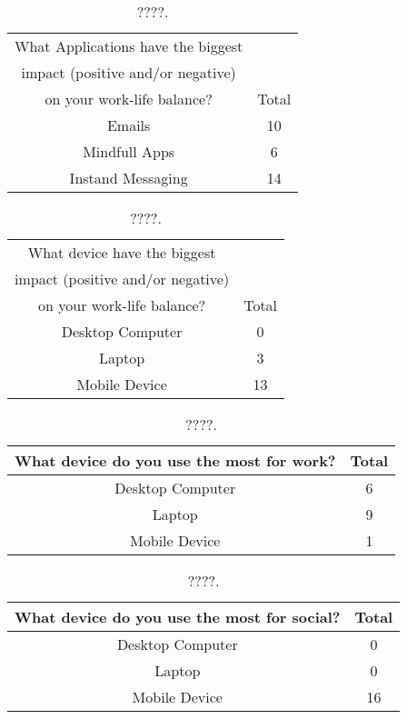 \documentclass{sigchi}
\begin{document}
\begin{table}[ht]
	\centering
	\begin{tabular}[t]{ |c| c | }
		\hline
		What Applications have the biggest & \\
		impact (positive and/or negative) & \\
		on your work-life balance?  & Total  \\ 
		\hline
		Emails & 10 \\ 
		\hline
		Mindfull Apps & 6  \\ 
		\hline
		Instand Messaging &  14 \\
		\hline
		
	\end{tabular}
	\caption{????.}
	\label{tab:app_impact}
\end{table}%

\begin{table}[ht]
	\centering
	\begin{tabular}[t]{ |c| c | }
		\hline
		What device have the biggest & \\
		impact (positive and/or negative) & \\
		on your work-life balance?  & Total  \\ 
		\hline
		Desktop Computer & 0 \\ 
		\hline
		Laptop & 3  \\ 
		\hline
		Mobile Device &  13 \\
		\hline
		
	\end{tabular}
	\caption{????.}
	\label{tab:device_impact}
\end{table}%

\begin{table}[ht]
	\centering
	\begin{tabular}[t]{ |c| c | }
		\hline
		What device do you use the most for work? & Total  \\ 
		\hline
		Desktop Computer & 6 \\ 
		\hline
		Laptop & 9  \\ 
		\hline
		Mobile Device &  1 \\
		\hline
	\end{tabular}
	\caption{????.}
	\label{tab:device_work}
\end{table}%
	

\begin{table}[ht]
	\centering
	\begin{tabular}[t]{ |c| c | }
		\hline
		What device do you use the most for social? & Total  \\ 
		\hline
		Desktop Computer & 0 \\ 
		\hline
		Laptop & 0  \\ 
		\hline
		Mobile Device &  16 \\
		\hline
	\end{tabular}
	\caption{????.}
	\label{tab:device_social}
\end{table}%
\end{document}
